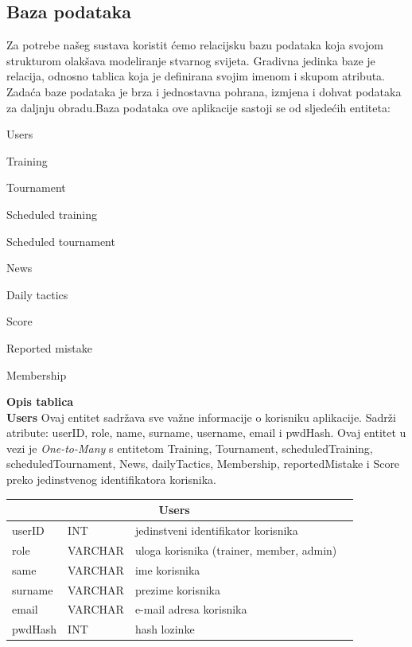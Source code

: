 \documentclass{article}
\begin{document}
		\eject
		\subsection{Baza podataka}
		Za potrebe našeg sustava koristit ćemo relacijsku bazu podataka koja svojom strukturom olakšava modeliranje stvarnog svijeta. Gradivna jedinka baze je relacija, odnosno tablica koja je definirana svojim imenom i skupom atributa. Zadaća baze podataka je brza i jednostavna pohrana, izmjena i dohvat podataka za daljnju obradu.Baza podataka ove aplikacije sastoji se od sljedećih entiteta:
		
			\begin{packed_item}
			
			\item {Users}
			\item  {Training} 
			\item  {Tournament}
			\item  {Scheduled training}
			\item  {Scheduled tournament}
			\item  {News}
			\item  {Daily tactics}
			\item  {Score}
			\item  {Reported mistake}
			\item  {Membership}
		\end{packed_item} 
		
	\large \textbf{Opis tablica}\\
	
	\textbf{Users} Ovaj entitet sadržava sve važne informacije o korisniku aplikacije. Sadrži atribute: userID, role, name, surname, username, email i pwdHash. Ovaj entitet u vezi je \textit{One-to-Many} s entitetom Training, Tournament, scheduledTraining, scheduledTournament, News, dailyTactics, Membership, reportedMistake i Score preko jedinstvenog identifikatora korisnika.
		
		
		
\setlength{\arrayrulewidth}{0.5mm}
\setlength{\tabcolsep}{10pt}
\renewcommand{\arraystretch}{1.5}		
		


	
	\begin{center}
    \begin{tabular}{ | l | l | l | p{5cm} |}
    \hline
    \multicolumn{3}{|c|}{Users}  \\ \hline
   \cellcolor{green!25}userID & INT & jedinstveni identifikator korisnika\\ \hline
    role & VARCHAR & uloga korisnika (trainer, member, admin)\\ \hline
    same & VARCHAR & ime korisnika \\ \hline
    surname & VARCHAR & prezime korisnika\\\hline
   email & VARCHAR & e-mail adresa korisnika\\ \hline
   pwdHash & INT & hash lozinke\\ \hline
    \end{tabular}
\end{center}
\eject
\end{document}
